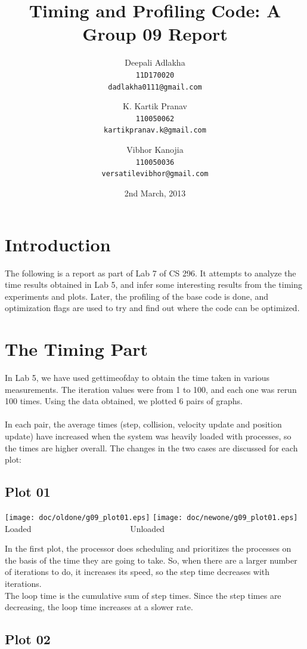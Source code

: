 \documentclass[a4paper,11pt]{article}
\title{Timing and Profiling Code: A Group 09 Report}
\author{
  Deepali Adlakha\\
  \texttt{11D170020}\\
  \texttt{dadlakha0111@gmail.com}
  \and
  K. Kartik Pranav\\
  \texttt{110050062}\\
  \texttt{kartikpranav.k@gmail.com}
  \and
  Vibhor Kanojia\\
  \texttt{110050036}\\
  \texttt{versatilevibhor@gmail.com}
}
\date{2nd March, 2013}
\begin{document}
\maketitle

\section{Introduction}
The following is a report as part of Lab 7 of CS 296. It attempts to analyze the time results obtained in Lab 5, and infer some interesting results from the timing experiments and plots. Later, the profiling of the base code is done, and optimization flags are used to try and find out where the code can be optimized.

\section{The Timing Part}
In Lab 5, we have used gettimeofday to obtain the time taken in various measurements. The iteration values were from 1 to 100, and each one was rerun 100 times. Using the data obtained, we plotted 6 pairs of graphs.\\\\
In each pair, the average times (step, collision, velocity update and position update) have increased when the system was heavily loaded with processes, so the times are higher overall. The changes in the two cases are discussed for each plot:

\subsection*{Plot 01}

\begin{center}
  \texttt{[image: doc/oldone/g09\_plot01.eps]}
  \texttt{[image: doc/newone/g09\_plot01.eps]}
\\  Loaded~~~~~~~~~~~~~~~~~~~~~~~ Unloaded  
\end{center}

In the first plot, the processor does scheduling and prioritizes the processes on the basis of the time they are going to take. So, when there are a larger number of iterations to do, it increases its speed, so the step time decreases with iterations.\\
The loop time is the cumulative sum of step times. Since the step times are decreasing, the loop time increases at a slower rate.

\subsection*{Plot 02}
\end{document}
